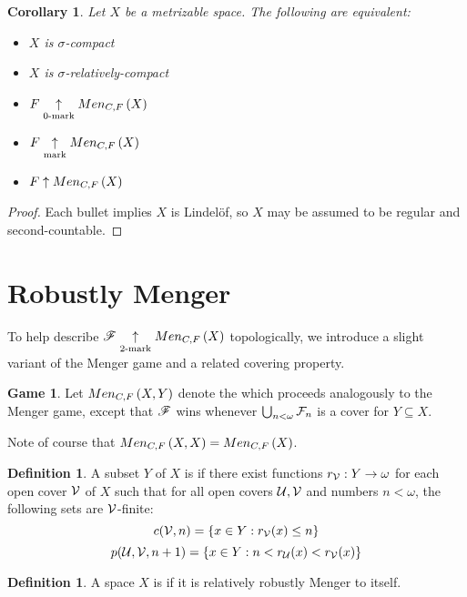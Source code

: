 \documentclass{amsart}
\newtheorem{corollary}[theorem]{Corollary}
\theoremstyle{definition}
\newtheorem{definition}[theorem]{Definition}
\newtheorem{game}[theorem]{Game}
\begin{document}
\begin{corollary}
  Let \(X\) be a metrizable space. The following are equivalent:
  \begin{itemize}
    \item \(X\) is \(\sigma\)-compact
    \item \(X\) is \(\sigma\)-relatively-compact
    \item \(F \underset{0\text{-mark}}{\uparrow} Men_{C,F}\left({X}\right)\)
    \item \(F \underset{\text{mark}}{\uparrow} Men_{C,F}\left({X}\right)\)
    \item \(F \uparrow Men_{C,F}\left({X}\right)\)
  \end{itemize}
\end{corollary}

\begin{proof}
  Each bullet implies \(X\) is Lindel\"of, so \(X\) may be assumed to be
  regular and second-countable.
\end{proof}



\section{Robustly Menger}

To help describe \(\mathscr{F}\underset{2\text{-mark}}{\uparrow}Men_{C,F}\left({X}\right)\) topologically, we introduce a
slight variant of the Menger game and a related covering property.

\begin{game}
  Let \(Men_{C,F}\left({X,Y}\right)\) denote the  which proceeds
  analogously to the Menger game, except that \(\mathscr{F}\) wins whenever
  \(\bigcup_{n<\omega} \mathcal{F}_n\) is a cover for \(Y\subseteq X\).
\end{game}

Note of course that \(Men_{C,F}\left({X,X}\right)=Men_{C,F}\left({X}\right)\).

\begin{definition}
  A subset \(Y\) of \(X\) is  if there exist
  functions \(r_{\mathcal{V}}:Y\to\omega\)
  for each open cover \(\mathcal{V}\) of \(X\) such that
  for all open covers \(\mathcal{U},\mathcal{V}\) and numbers \(n<\omega\),
  the following sets are \(\mathcal{V}\)-finite:
    \[
      c(\mathcal{V},n)=\{ x\in Y : r_{\mathcal{V}}(x)\leq n\}
    \]
    \[
      p(\mathcal{U},\mathcal{V},n+1)=\{ x\in Y : n<r_{\mathcal{U}}(x)<r_{\mathcal{V}}(x)\}
    \]
\end{definition}

\begin{definition}
  A space \(X\) is  if it is relatively robustly
  Menger to itself.
\end{definition}
\end{document}

